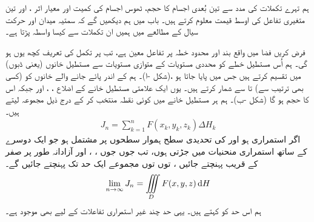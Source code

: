 ہم تہرے  تکملات کی مدد سے تین بُعدی اجسام کا حجم،  ٹھوس اجسام کی کمیت  اور معیار اثر ، اور تین متغیری تفاعل کی اوسط قیمت معلوم کرتے ہیں۔  باب  میں ہم دیکھیں گے کہ سمتیہ میدان   اور  حرکت سیال  کے مطالعے  میں ہمیں ان تکملات سے کیسا واسطہ پڑتا ہے۔

فرض کریں فضا میں  واقع بند  اور محدود   خطہ   پر تفاعل  معین ہے، تب  پر تکمل   کی تعریف کچھ یوں ہو گی۔ ہم   اُس مستطیل خطے   کو محددی مستویات کے متوازی  مستویات  سے مستطیل خانوں (یعنی  ڈبوں) میں تقسیم کرتے ہیں   جس میں  پایا جاتا ہو ،(شکل -ا)۔ ہم  کے اندر پائے جانے والے  خانوں کو  (کسی بھی ترتیب سے)  تا   سے   شمار  کرتے ہیں۔   یوں ایک علامتی مستطیل خانے کے اضلاع ،  ، اور  جبکہ اس کا حجم  ہو گا (شکل -ب)۔ ہم ہر مستطیل خانے میں کوئی نقطہ  منتخب کر کے درج ذیل مجموعہ  لیتے  ہیں۔
\begin{align}\label{مساوات_بالکثرت_تہرا_مجموعہ_الف}
J_n=\sum_{k=1}^{n} F(x_k,y_k,z_k)\Delta H_k
\end{align}
اگر  استمراری ہو اور  کی تحدیدی سطح ہموار سطحوں پر مشتمل ہو جو ایک دوسرے کے ساتھ استمراری منحنیات میں جڑتی ہوں، تب جوں جوں ، ،  اور  آزادانہ  طور پر  صفر کے قریب پہنچتے جائیں ، توں توں  مجموعے     ایک حد تک پہنچتے جائیں    گے۔
\begin{align}
\lim_{n\to \infty}J_n=\iiint\limits_D F(x,y,z)\dif H
\end{align} 
ہم اس حد کو کہتے ہیں۔ یہی حد چند غیر استمراری تفاعلات  کے لیے بھی موجود ہے۔
